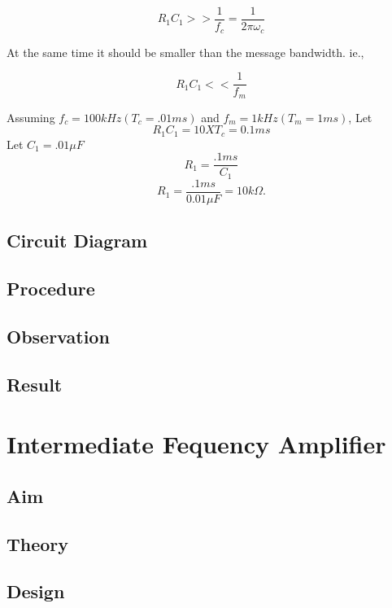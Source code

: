 \documentclass{book}
\begin{document}
\begin{equation}
R_1C_1 >> \frac{1}{f_c} = \frac{1}{2\pi\omega_c}
\end{equation}

\noindent At the same time it should be smaller than the message bandwidth. ie.,

\begin{equation}
R_1C_1<< \frac{1}{f_m}
\end{equation}

\noindent Assuming $f_c=100 kHz(T_c=.01ms)$ and $f_m=1kHz(T_m=1 ms)$,
Let 
\begin{equation}
R_1C_1 = 10 X T_c =0.1 ms
\end{equation}
\noindent Let $C_1=.01\mu F$
\begin{equation}
R_1 = \frac{.1ms}{C_1} 
\end{equation}
\begin{equation}
R_1 = \frac{.1ms}{0.01\mu F}=10 k\Omega. 
\end{equation}
\section*{Circuit Diagram}
\section*{Procedure}
\section*{Observation}
\section*{Result}





\chapter[Intermediate Frequency Amplifier]{Intermediate Fequency Amplifier}
\section*{Aim}
\section*{Theory}
\section*{Design}
\end{document}
